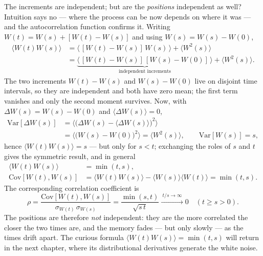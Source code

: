 The increments are independent; but are the \emph{positions} independent as well?
Intuition says no --- where the process can be now depends on where it was --- and the autocorrelation function confirms it.
Writing $W(t)=W(s)+[W(t)-W(s)]$ and using $W(s)=W(s)-W(0)$,
\begin{equation}\begin{split}
\langle W(t)W(s)\rangle &= \big\langle\,[W(t)-W(s)]\,W(s)\,\big\rangle + \langle W^2(s)\rangle\\
&= \underbrace{\big\langle\,[W(t)-W(s)]\,[W(s)-W(0)]\,\big\rangle}_{\text{independent increments}} + \langle W^2(s)\rangle.
\end{split}\end{equation}
The two increments $W(t)-W(s)$ and $W(s)-W(0)$ live on disjoint time intervals, so they are independent and both have zero mean; the first term vanishes and only the second moment survives.
Now, with $\Delta W(s)=W(s)-W(0)$ and $\langle\Delta W(s)\rangle=0$,
\begin{equation}\begin{split}
\mathrm{Var}[\Delta W(s)] &= \big\langle\big(\Delta W(s)-\langle\Delta W(s)\rangle\big)^2\big\rangle\\
&= \big\langle\big(W(s)-W(0)\big)^2\big\rangle = \langle W^2(s)\rangle,
\qquad \mathrm{Var}[W(s)] = s,
\end{split}\end{equation}
hence $\langle W(t)W(s)\rangle = s$ --- but only for $s<t$; exchanging the roles of $s$ and $t$ gives the symmetric result, and in general
\begin{equation}\begin{split}
\langle W(t)W(s)\rangle &= \min(t,s),\\
\mathrm{Cov}[W(t),W(s)] &= \langle W(t)W(s)\rangle - \langle W(s)\rangle\langle W(t)\rangle = \min(t,s).
\end{split}\end{equation}
The corresponding correlation coefficient is
\begin{equation}
\rho = \frac{\mathrm{Cov}[W(t),W(s)]}{\sigma_{W(t)}\,\sigma_{W(s)}} = \frac{\min(s,t)}{\sqrt{s\,t}} \xrightarrow{\ t/s\to\infty\ } 0\quad(t\ge s>0).
\end{equation}
The positions are therefore \emph{not} independent: they are the more correlated the closer the two times are, and the memory fades --- but only slowly --- as the times drift apart.
The curious formula $\langle W(t)W(s)\rangle=\min(t,s)$ will return in the next chapter, where its distributional derivatives generate the white noise.


